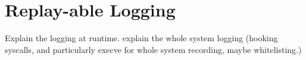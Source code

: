 \section{Replay-able Logging}
\label{s:logging}

Explain the logging at runtime.
explain the whole system logging (hooking syscalls, and particularly execve for whole system recording, maybe whitelisting.)
